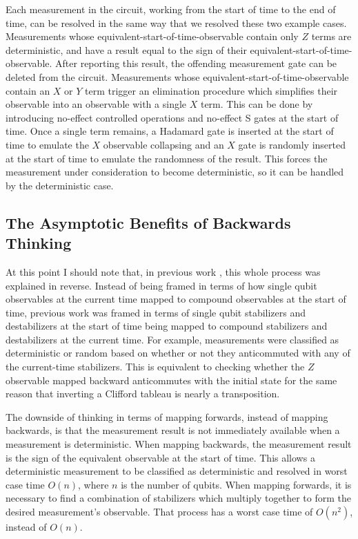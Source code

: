 \documentclass[onecolumn,unpublished]{quantumarticle}
\theoremstyle{definition}
\theoremstyle{definition}
\theoremstyle{definition}
\begin{document}
Each measurement in the circuit, working from the start of time to the end of time, can be resolved in the same way that we resolved these two example cases.
Measurements whose equivalent-start-of-time-observable contain only $Z$ terms are deterministic, and have a result equal to the sign of their equivalent-start-of-time-observable.
After reporting this result, the offending measurement gate can be deleted from the circuit.
Measurements whose equivalent-start-of-time-observable contain an $X$ or $Y$ term trigger an elimination procedure which simplifies their observable into an observable with a single $X$ term.
This can be done by introducing no-effect controlled operations and no-effect S gates at the start of time.
Once a single term remains, a Hadamard gate is inserted at the start of time to emulate the $X$ observable collapsing and an $X$ gate is randomly inserted at the start of time to emulate the randomness of the result.
This forces the measurement under consideration to become deterministic, so it can be handled by the deterministic case.

\subsection{The Asymptotic Benefits of Backwards Thinking}

At this point I should note that, in previous work \cite{aaronson2004chp}, this whole process was explained in reverse.
Instead of being framed in terms of how single qubit observables at the current time mapped to compound observables at the start of time, previous work was framed in terms of single qubit stabilizers and destabilizers at the start of time being mapped to compound stabilizers and destabilizers at the current time.
For example, measurements were classified as deterministic or random based on whether or not they anticommuted with any of the current-time stabilizers.
This is equivalent to checking whether the $Z$ observable mapped backward anticommutes with the initial state for the same reason that inverting a Clifford tableau is nearly a transposition.

The downside of thinking in terms of mapping forwards, instead of mapping backwards, is that the measurement result is not immediately available when a measurement is deterministic.
When mapping backwards, the measurement result is the sign of the equivalent observable at the start of time.
This allows a deterministic measurement to be classified as deterministic and resolved in worst case time $O(n)$, where $n$ is the number of qubits.
When mapping forwards, it is necessary to find a combination of stabilizers which multiply together to form the desired measurement's observable.
That process has a worst case time of $O(n^2)$, instead of $O(n)$.
\end{document}
